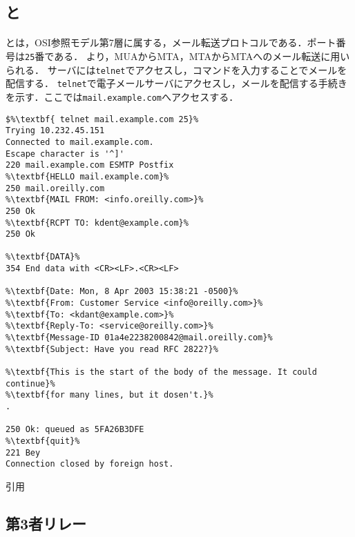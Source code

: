\subsection{\smtp と \popt}
\paragraph{\smtp}\smtp とは，OSI参照モデル第7層に属する，メール転送プロトコルである．ポート番号は\texttt{25}番である．
より，MUAからMTA，MTAからMTAへのメール転送に用いられる．
\smtp サーバには\texttt{telnet}でアクセスし，コマンドを入力することでメールを配信する．
\texttt{telnet}で電子メールサーバにアクセスし，メールを配信する手続きを示す．ここでは\texttt{mail.example.com}へアクセスする．
\begin{lstlisting}[escapechar=\%,frame={single},caption={\smtp コマンド入力},label={src:smtpコマンド入力}]
$%\textbf{ telnet mail.example.com 25}%
Trying 10.232.45.151
Connected to mail.example.com.
Escape character is '^]'
220 mail.example.com ESMTP Postfix
%\textbf{HELLO mail.example.com}%
250 mail.oreilly.com
%\textbf{MAIL FROM: <info.oreilly.com>}%
250 Ok
%\textbf{RCPT TO: kdent@example.com}%
250 Ok

%\textbf{DATA}%
354 End data with <CR><LF>.<CR><LF>

%\textbf{Date: Mon, 8 Apr 2003 15:38:21 -0500}%
%\textbf{From: Customer Service <info@oreilly.com>}%
%\textbf{To: <kdant@example.com>}%
%\textbf{Reply-To: <service@oreilly.com>}%
%\textbf{Message-ID 01a4e2238200842@mail.oreilly.com}%
%\textbf{Subject: Have you read RFC 2822?}%

%\textbf{This is the start of the body of the message. It could continue}%
%\textbf{for many lines, but it dosen't.}%
.

250 Ok: queued as 5FA26B3DFE
%\textbf{quit}%
221 Bey
Connection closed by foreign host.
\end{lstlisting}
\hfill 引用\cite[p.18]{Postfix実用ガイド}

\subsection{第3者リレー}
